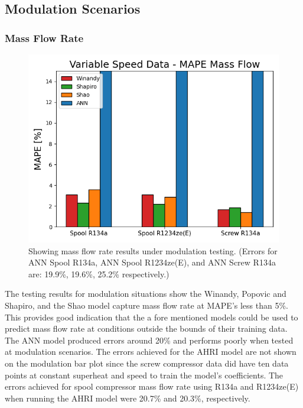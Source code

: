 \documentclass[preprint,11pt,authoryear]{elsarticle}
\begin{document}
\subsection{Modulation Scenarios}
\subsubsection{Mass Flow Rate}

\begin{figure}[h]
\captionsetup{justification=centering}
\centering
\includegraphics[width=0.7\linewidth]{mdot_vspeed.png}
\caption{Showing mass flow rate results under modulation testing. (Errors for ANN Spool R134a, ANN Spool R1234ze(E), and ANN Screw R134a are: 19.9\%, 19.6\%, 25.2\% respectively.)}
\label{fig:mdot_vspd}
\end{figure}
\FloatBarrier

The testing results for modulation situations show the Winandy, Popovic and Shapiro, and the Shao model capture mass flow rate at MAPE's less than 5\%. This provides good indication that the a fore mentioned models could be used to predict mass flow rate at conditions outside the bounds of their training data. The ANN model produced errors around 20\% and performs poorly when tested at modulation scenarios. The errors achieved for the AHRI model are not shown on the modulation bar plot since the screw compressor data did have ten data points at constant superheat and speed to train the model's coefficients. The errors achieved for spool compressor mass flow rate using R134a and R1234ze(E) when running the AHRI model were 20.7\% and 20.3\%, respectively. 
\end{document}
